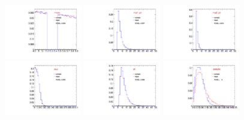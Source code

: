 \begin{figure}
  \includegraphics[width=0.3\textwidth]{Figures/VariablesComparison/Data_endcaps_figs/m}
  \includegraphics[width=0.3\textwidth]{Figures/VariablesComparison/Data_endcaps_figs/m1pt}
  \includegraphics[width=0.3\textwidth]{Figures/VariablesComparison/Data_endcaps_figs/m2pt}
  \includegraphics[width=0.3\textwidth]{Figures/VariablesComparison/Data_endcaps_figs/maxdoca}
  \includegraphics[width=0.3\textwidth]{Figures/VariablesComparison/Data_endcaps_figs/pt}
  \includegraphics[width=0.3\textwidth]{Figures/VariablesComparison/Data_endcaps_figs/pvip}

\end{figure}
